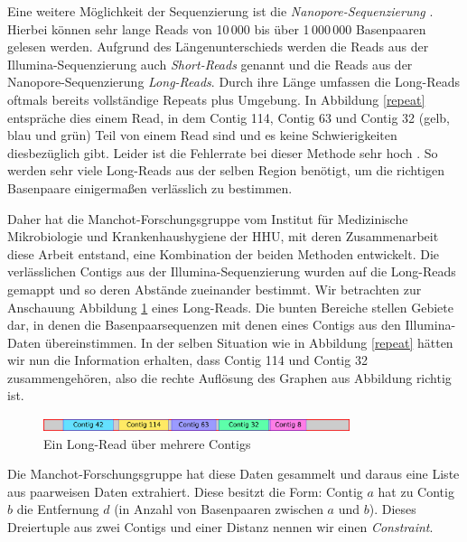 Eine weitere Möglichkeit der Sequenzierung ist die 
\emph{Nanopore-Sequenzierung} \cite{Nanopore}. Hierbei können sehr lange Reads von 10\,000 bis über 1\,000\,000 Basenpaaren gelesen werden. Aufgrund des Längenunterschieds werden die Reads aus der 
Illumina-Sequenzierung auch \emph{Short-Reads} genannt 
und die Reads aus der Nanopore-Sequenzierung \emph{Long-Reads}. Durch ihre Länge umfassen die Long-Reads oftmals bereits vollständige Repeats plus Umgebung. In 
Abbildung \ref{repeat} entspräche dies einem Read, in dem Contig 114, Contig 63 und Contig 32 (gelb, blau und grün) Teil von einem Read sind und es keine Schwierigkeiten diesbezüglich gibt. Leider ist die Fehlerrate bei dieser Methode sehr hoch \cite{Harris475194}. 
So werden sehr viele Long-Reads aus der selben Region benötigt, um die richtigen Basenpaare einigermaßen verlässlich zu bestimmen.


Daher hat die Manchot-Forschungsgruppe vom Institut für Medizinische Mikrobiologie und Krankenhaushygiene der HHU, mit deren Zusammenarbeit diese Arbeit entstand, eine Kombination der beiden Methoden entwickelt.
Die verlässlichen Contigs aus der 
Illumina-Sequenzierung wurden auf die Long-Reads gemappt und so deren Abstände zueinander bestimmt. 
Wir betrachten zur Anschauung Abbildung \ref{longread} eines Long-Reads. Die bunten Bereiche stellen Gebiete dar, in denen die Basenpaarsequenzen mit denen eines Contigs aus den 
Illumina-Daten übereinstimmen. In der selben Situation wie in Abbildung \ref{repeat} hätten wir nun die Information erhalten, dass Contig 114 und Contig 32 zusammengehören, also die rechte Auflösung des Graphen aus Abbildung  richtig ist.
\begin{figure}[b!]
\begin{center}
\includegraphics[width=0.8\textwidth]{bilder/longread}
\end{center}
\caption{Ein Long-Read über mehrere Contigs}
\label{longread}
\end{figure}

Die Manchot-Forschungsgruppe hat diese Daten gesammelt und daraus eine Liste aus paarweisen Daten extrahiert. Diese besitzt die Form: Contig $a$ hat zu Contig $b$ die Entfernung $d$ (in Anzahl von Basenpaaren zwischen $a$ und $b$). Dieses Dreiertuple aus zwei Contigs und einer Distanz nennen wir einen \emph{Constraint}.


